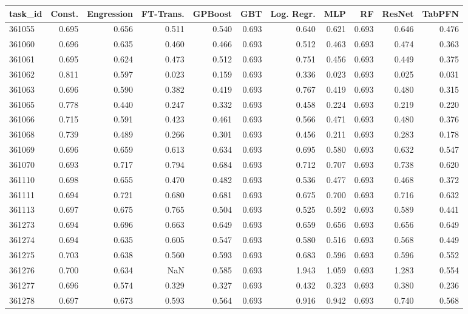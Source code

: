 \begin{tabular}{lrrrrrrrrrr}
\toprule
task\_id & Const. & Engression & FT-Trans. & GPBoost & GBT & Log. Regr. & MLP & RF & ResNet & TabPFN \\
\midrule
361055 & 0.695 & 0.656 & 0.511 & 0.540 & 0.693 & 0.640 & 0.621 & 0.693 & 0.646 & 0.476 \\
361060 & 0.696 & 0.635 & 0.460 & 0.466 & 0.693 & 0.512 & 0.463 & 0.693 & 0.474 & 0.363 \\
361061 & 0.695 & 0.624 & 0.473 & 0.512 & 0.693 & 0.751 & 0.456 & 0.693 & 0.449 & 0.375 \\
361062 & 0.811 & 0.597 & 0.023 & 0.159 & 0.693 & 0.336 & 0.023 & 0.693 & 0.025 & 0.031 \\
361063 & 0.696 & 0.590 & 0.382 & 0.419 & 0.693 & 0.767 & 0.419 & 0.693 & 0.480 & 0.315 \\
361065 & 0.778 & 0.440 & 0.247 & 0.332 & 0.693 & 0.458 & 0.224 & 0.693 & 0.219 & 0.220 \\
361066 & 0.715 & 0.591 & 0.423 & 0.461 & 0.693 & 0.566 & 0.471 & 0.693 & 0.480 & 0.376 \\
361068 & 0.739 & 0.489 & 0.266 & 0.301 & 0.693 & 0.456 & 0.211 & 0.693 & 0.283 & 0.178 \\
361069 & 0.696 & 0.659 & 0.613 & 0.634 & 0.693 & 0.695 & 0.580 & 0.693 & 0.632 & 0.547 \\
361070 & 0.693 & 0.717 & 0.794 & 0.684 & 0.693 & 0.712 & 0.707 & 0.693 & 0.738 & 0.620 \\
361110 & 0.698 & 0.655 & 0.470 & 0.482 & 0.693 & 0.536 & 0.477 & 0.693 & 0.468 & 0.372 \\
361111 & 0.694 & 0.721 & 0.680 & 0.681 & 0.693 & 0.675 & 0.700 & 0.693 & 0.716 & 0.632 \\
361113 & 0.697 & 0.675 & 0.765 & 0.504 & 0.693 & 0.525 & 0.592 & 0.693 & 0.589 & 0.441 \\
361273 & 0.694 & 0.696 & 0.663 & 0.649 & 0.693 & 0.659 & 0.656 & 0.693 & 0.656 & 0.649 \\
361274 & 0.694 & 0.635 & 0.605 & 0.547 & 0.693 & 0.580 & 0.516 & 0.693 & 0.568 & 0.449 \\
361275 & 0.703 & 0.638 & 0.560 & 0.593 & 0.693 & 0.683 & 0.596 & 0.693 & 0.596 & 0.552 \\
361276 & 0.700 & 0.634 & NaN & 0.585 & 0.693 & 1.943 & 1.059 & 0.693 & 1.283 & 0.554 \\
361277 & 0.696 & 0.574 & 0.329 & 0.327 & 0.693 & 0.432 & 0.323 & 0.693 & 0.380 & 0.236 \\
361278 & 0.697 & 0.673 & 0.593 & 0.564 & 0.693 & 0.916 & 0.942 & 0.693 & 0.740 & 0.568 \\

\end{tabular}
